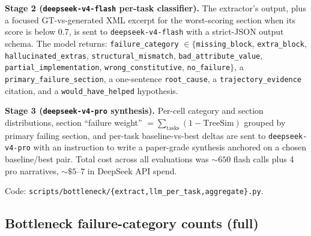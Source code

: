 \documentclass{article}
\begin{document}
\textbf{Stage 2 (\texttt{deepseek-v4-flash} per-task classifier).} The extractor's output, plus a focused GT-vs-generated XML excerpt for the worst-scoring section when its score is below 0.7, is sent to \texttt{deepseek-v4-flash} with a strict-JSON output schema. The model returns: \texttt{failure\_category} $\in \{$\texttt{missing\_block}, \texttt{extra\_block}, \texttt{hallucinated\_extras}, \texttt{structural\_mismatch}, \texttt{bad\_attribute\_value}, \texttt{partial\_implementation}, \texttt{wrong\_constitutive}, \texttt{no\_failure}$\}$, a \texttt{primary\_failure\_section}, a one-sentence \texttt{root\_cause}, a \texttt{trajectory\_evidence} citation, and a \texttt{would\_have\_helped} hypothesis.

\textbf{Stage 3 (\texttt{deepseek-v4-pro} synthesis).} Per-cell category and section distributions, section ``failure weight'' $= \sum_{\mathrm{tasks}}(1 - \mathrm{TreeSim})$ grouped by primary failing section, and per-task baseline-vs-best deltas are sent to \texttt{deepseek-v4-pro} with an instruction to write a paper-grade synthesis anchored on a chosen baseline/best pair. Total cost across all evaluations was ${\sim}650$ flash calls plus 4 pro narratives, ${\sim}\$5\text{--}7$ in DeepSeek API spend.

Code: \texttt{scripts/bottleneck/\{extract,llm\_per\_task,aggregate\}.py}.

\subsection{Bottleneck failure-category counts (full)}
\label{app:bottleneck-counts}

\begin{table}[h]
  \caption{Failure-category counts per cell. val panel uses $n=51$ tasks per cell ($3{\times}17$); held-out-eval panel uses $n=29$--$30$ ($3{\times}10$ minus a small number of LLM-judge parse-failures).}
  \label{tab:bottleneck}
  \centering
  \footnotesize
\end{table}
\end{document}
